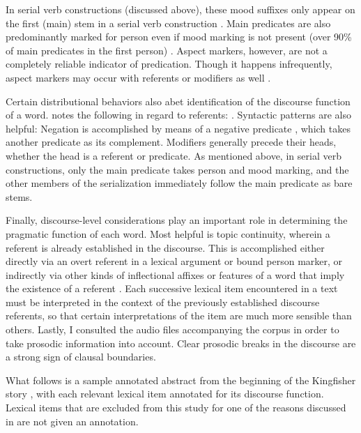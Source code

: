\noindent In serial verb constructions (discussed above), these mood suffixes only appear on the first (main) stem in a serial verb construction \parencite[42]{Nakayama2001}. Main predicates are also predominantly marked for person even if mood marking is not present (over 90\% of main predicates in the first person) \parencite[29]{Nakayama2001}. Aspect markers, however, are not a completely reliable indicator of predication. Though it happens infrequently, aspect markers may occur with referents or modifiers as well \parencite[47--50]{Nakayama2001}.

Certain distributional behaviors also abet identification of the discourse function of a word. \citeauthor{Nakayama2001} notes the following in regard to referents: . Syntactic patterns are also helpful: Negation is accomplished by means of a negative predicate , which takes another predicate as its complement. Modifiers generally precede their heads, whether the head is a referent or predicate. As mentioned above, in serial verb constructions, only the main predicate takes person and mood marking, and the other members of the serialization immediately follow the main predicate as bare stems.

Finally, discourse-level considerations play an important role in determining the pragmatic function of each word. Most helpful is topic continuity, wherein a referent is already established in the discourse. This is accomplished either directly via an overt referent in a lexical argument or bound person marker, or indirectly via other kinds of inflectional affixes or features of a word that imply the existence of a referent . Each successive lexical item encountered in a text must be interpreted in the context of the previously established discourse referents, so that certain interpretations of the item are much more sensible than others. Lastly, I consulted the audio files accompanying the corpus in order to take prosodic information into account. Clear prosodic breaks in the discourse are a strong sign of clausal boundaries.

What follows is a sample annotated abstract from the beginning of the Kingfisher story \parencite{Louie2003}, with each relevant lexical item annotated for its discourse function. Lexical items that are excluded from this study for one of the reasons discussed in  are not given an annotation.

